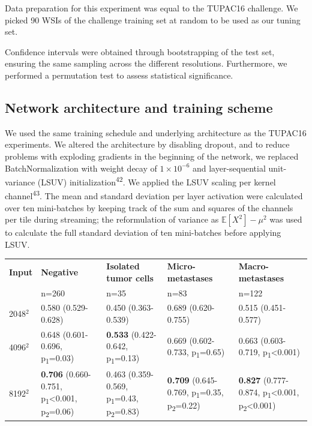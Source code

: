\documentclass[
  12pt,
  a5,margin=2cmpaper,
]{article}
\begin{document}
Data preparation for this experiment was equal to the TUPAC16 challenge.
We picked 90 WSIs of the challenge training set at random to be used as
our tuning set.

Confidence intervals were obtained through bootstrapping of the test
set, ensuring the same sampling across the different resolutions.
Furthermore, we performed a permutation test to assess statistical
significance.

\hypertarget{network-architecture-and-training-scheme-2}{%
\subsection{Network architecture and training
scheme}\label{network-architecture-and-training-scheme-2}}

We used the same training schedule and underlying architecture as the
TUPAC16 experiments. We altered the architecture by disabling dropout,
and to reduce problems with exploding gradients in the beginning of the
network, we replaced BatchNormalization with weight decay of
\(1 \times 10^{-6}\) and layer-sequential unit-variance (LSUV)
initialization\textsuperscript{42}. We applied the LSUV scaling per
kernel channel\textsuperscript{43}. The mean and standard deviation per
layer activation were calculated over ten mini-batches by keeping track
of the sum and squares of the channels per tile during streaming; the
reformulation of variance as \(\mathbb{E}[X^2] - \mu^2\) was used to
calculate the full standard deviation of ten mini-batches before
applying LSUV.

\begin{longtable}[]{@{}lllll@{}}
\toprule\noalign{}
\endhead
\bottomrule\noalign{}
\endlastfoot
\textbf{Input} & \textbf{Negative} & \textbf{Isolated tumor cells} &
\textbf{Micro-metastases} & \textbf{Macro-metastases} \\
& n=260 & n=35 & n=83 & n=122 \\
2048\(^2\) & 0.580 (0.529-0.628) & 0.450 (0.363-0.539) & 0.689
(0.620-0.755) & 0.515 (0.451-0.577) \\
4096\(^2\) & 0.648 (0.601-0.696, p\textsubscript{1}=0.03) &
\textbf{0.533} (0.422-0.642, p\textsubscript{1}=0.13) & 0.669
(0.602-0.733, p\textsubscript{1}=0.65) & 0.663 (0.603-0.719,
p\textsubscript{1}\textless0.001) \\
8192\(^2\) & \textbf{0.706} (0.660-0.751,
p\textsubscript{1}\textless0.001, p\textsubscript{2}=0.06) & 0.463
(0.359-0.569, p\textsubscript{1}=0.43, p\textsubscript{2}=0.83) &
\textbf{0.709} (0.645-0.769, p\textsubscript{1}=0.35,
p\textsubscript{2}=0.22) & \textbf{0.827} (0.777-0.874,
p\textsubscript{1}\textless0.001, p\textsubscript{2}\textless0.001) \\
\end{longtable}
\end{document}
